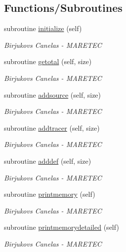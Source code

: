 \subsection*{Functions/\+Subroutines}
\begin{DoxyCompactItemize}
\item 
subroutine \mbox{\hyperlink{namespacesimulation__memory_a3b8f4e0766c90e6d6bd99e2fa49ea91b}{initialize}} (self)
\begin{DoxyCompactList}\small\item\em Birjukovs Canelas -\/ M\+A\+R\+E\+T\+EC \end{DoxyCompactList}\item 
subroutine \mbox{\hyperlink{namespacesimulation__memory_a8589522c4e28cf60741a5439477cdb31}{getotal}} (self, size)
\begin{DoxyCompactList}\small\item\em Birjukovs Canelas -\/ M\+A\+R\+E\+T\+EC \end{DoxyCompactList}\item 
subroutine \mbox{\hyperlink{namespacesimulation__memory_acf01ce7bcb2d7571d37fb2c0338e5bd2}{addsource}} (self, size)
\begin{DoxyCompactList}\small\item\em Birjukovs Canelas -\/ M\+A\+R\+E\+T\+EC \end{DoxyCompactList}\item 
subroutine \mbox{\hyperlink{namespacesimulation__memory_a4d6c8bd027a99cb6c7f9ad2eb55c744f}{addtracer}} (self, size)
\begin{DoxyCompactList}\small\item\em Birjukovs Canelas -\/ M\+A\+R\+E\+T\+EC \end{DoxyCompactList}\item 
subroutine \mbox{\hyperlink{namespacesimulation__memory_a62d5641dbec45bc279575c173b0f0f24}{adddef}} (self, size)
\begin{DoxyCompactList}\small\item\em Birjukovs Canelas -\/ M\+A\+R\+E\+T\+EC \end{DoxyCompactList}\item 
subroutine \mbox{\hyperlink{namespacesimulation__memory_a5827bef8479b809a453af147ceaa8c7c}{printmemory}} (self)
\begin{DoxyCompactList}\small\item\em Birjukovs Canelas -\/ M\+A\+R\+E\+T\+EC \end{DoxyCompactList}\item 
subroutine \mbox{\hyperlink{namespacesimulation__memory_af2a472000acc1ff59cb6e63679617699}{printmemorydetailed}} (self)
\begin{DoxyCompactList}\small\item\em Birjukovs Canelas -\/ M\+A\+R\+E\+T\+EC \end{DoxyCompactList}\end{DoxyCompactItemize}
